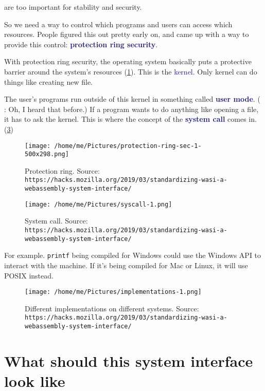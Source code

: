 \documentclass[dvipsnames]{article}
\newcommand{\mycola}{MidnightBlue}
\newcommand{\cola}[1]{\textcolor{\mycola}{#1}}
\newcommand{\Cola}[1]{\textcolor{\mycola}{\textbf{#1}}}
\begin{document}
are too important for stability and security.

So we need a way to control which programs and users can access which resources.
People figured this out pretty early on, and came up with a way to provide this
control: \Cola{protection ring security}.

With protection ring security, the operating system basically puts a protective
barrier around the system's resources (\cref{fig:protection-ring}). This is the \cola{kernel}. Only kernel
can do things like creating new file.

The user's programs run outside of this kernel in something called \Cola{user
  mode}. ( : Oh, I heard that before.) If a program wants to do
anything like opening a file, it has to ask the kernel.
This is where the concept of the \Cola{system call} comes in.(\cref{fig:syscall}) 
\begin{figure}[ht]
  \centering
  \texttt{[image: /home/me/Pictures/protection-ring-sec-1-500x298.png]}
  \caption{Protection ring. Source: \texttt{https://hacks.mozilla.org/2019/03/standardizing-wasi-a-webassembly-system-interface/}}
  \label{fig:protection-ring}
\end{figure}


\begin{figure}[ht]
  \centering
  \texttt{[image: /home/me/Pictures/syscall-1.png]}
  \caption{System call. Source: \texttt{https://hacks.mozilla.org/2019/03/standardizing-wasi-a-webassembly-system-interface/}}
  \label{fig:syscall}
\end{figure}

For example. \texttt{printf} being compiled for Windows could use the Windows
API to interact with the machine. If it's being compiled for Mac or Linux, it
will use POSIX instead.


\begin{figure}[ht]
  \centering
  \texttt{[image: /home/me/Pictures/implementations-1.png]}
  \caption{Different implementations on different systems. Source:
    \texttt{https://hacks.mozilla.org/2019/03/standardizing-wasi-a-webassembly-system-interface/}}
  \label{fig:syscall}
\end{figure}

\section{What should this system interface look like}
\end{document}
